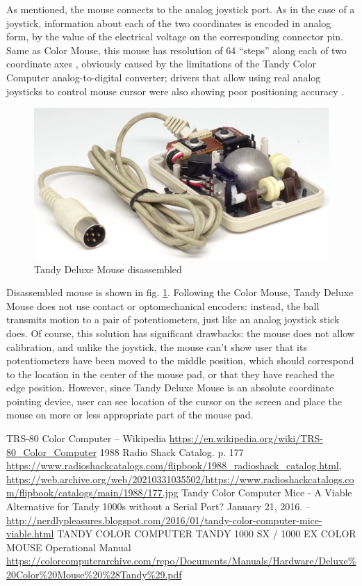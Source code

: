 \documentclass[11pt, a4paper]{article}
\begin{document}
As mentioned, the mouse connects to the analog joystick port. As in the case of a joystick, information about each of the two coordinates is encoded in analog form, by the value of the electrical voltage on the corresponding connector pin. Same as Color Mouse, this mouse has resolution of 64 ``steps'' along each of two coordinate axes \cite{manual}, obviously caused by the limitations of the Tandy Color Computer analog-to-digital converter; drivers that allow using real analog joysticks to control mouse cursor were also showing poor positioning accuracy \cite{hierophant}.

\begin{figure}[h]
    \centering
    \includegraphics[scale=0.8]{1988_tandy_trs80_deluxe_mouse/inside_30.jpg}
    \caption{Tandy Deluxe Mouse disassembled}
    \label{fig:TandyDeluxeMouseInside}
\end{figure}

Disassembled mouse is shown in fig. \ref{fig:TandyDeluxeMouseInside}. Following the Color Mouse, Tandy Deluxe Mouse does not use contact or optomechanical encoders: instead, the ball transmits motion to a pair of potentiometers, just like an analog joystick stick does. Of course, this solution has significant drawbacks: the mouse does not allow calibration, and unlike the joystick, the mouse can't show user that its potentiometers have been moved to the middle position, which should correspond to the location in the center of the mouse pad, or that they have reached the edge position. However, since Tandy Deluxe Mouse is an absolute coordinate pointing device, user can see location of the cursor on the screen and place the mouse on more or less appropriate part of the mouse pad.

\begin{thebibliography}{9}
 TRS-80 Color Computer -- Wikipedia \url{https://en.wikipedia.org/wiki/TRS-80_Color_Computer}
 1988 Radio Shack Catalog. p. 177 \url{https://www.radioshackcatalogs.com/flipbook/1988_radioshack_catalog.html}, \url{https://web.archive.org/web/20210331035502/https://www.radioshackcatalogs.com/flipbook/catalogs/main/1988/177.jpg}
 Tandy Color Computer Mice - A Viable Alternative for Tandy 1000s without a Serial Port? January 21, 2016. -- \url{http://nerdlypleasures.blogspot.com/2016/01/tandy-color-computer-mice-viable.html}
 TANDY  COLOR COMPUTER TANDY 1000 SX / 1000 EX COLOR MOUSE Operational Manual \url{https://colorcomputerarchive.com/repo/Documents/Manuals/Hardware/Deluxe%20Color%20Mouse%20%28Tandy%29.pdf}
\end{thebibliography}
\end{document}
